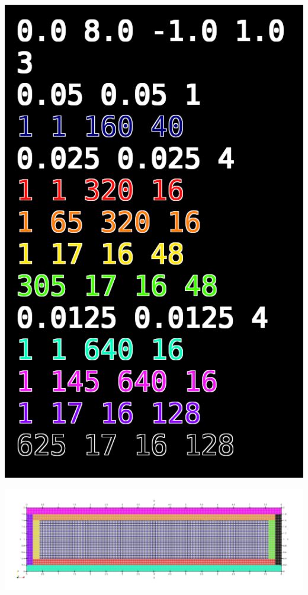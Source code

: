\documentclass[../main/main.tex]{subfiles}
\begin{document}
\begin{frame}{}
	\begin{center}
		\begin{minipage}{0.20\textwidth}
			\includegraphics[width=\textwidth]{imgs/ref3_PorPartes_amrColors.png}
		\end{minipage}
		\hfill
		\begin{minipage}{0.75\textwidth}
			\includegraphics[width=\textwidth]{imgs/ref3_PorPartes.png}
			

\end{minipage}
\end{center}
\end{frame}
\end{document}
